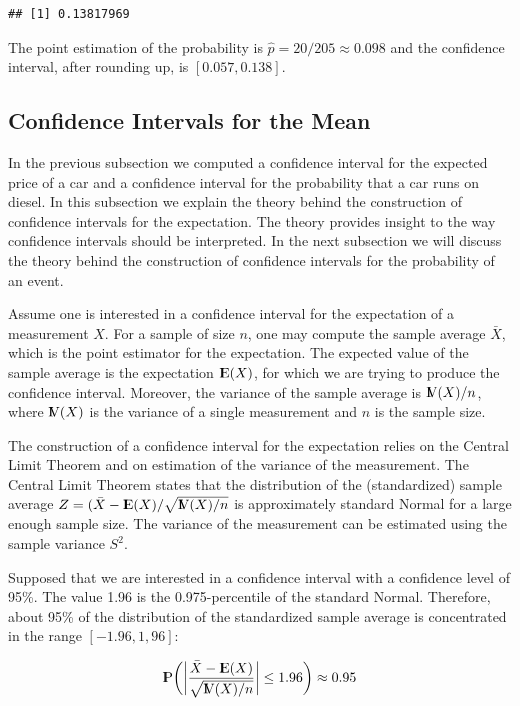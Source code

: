 \documentclass[]{krantz}
\newcommand{\Expec}{{\rm I\kern-.3em E}}
\newcommand{\Prob}{{\rm I\kern-.3em P}}
\newcommand{\Var}{{\rm I\kern-.3em V}}
\theoremstyle{definition}
\theoremstyle{definition}
\theoremstyle{definition}
\theoremstyle{remark}
\begin{document}
\begin{verbatim}
## [1] 0.13817969
\end{verbatim}

The point estimation of the probability is
\(\hat p = 20/205 \approx 0.098\) and the confidence interval, after
rounding up, is \([0.057, 0.138]\).

\subsection{Confidence Intervals for the Mean}\label{subsec:CImean}

In the previous subsection we computed a confidence interval for the
expected price of a car and a confidence interval for the probability
that a car runs on diesel. In this subsection we explain the theory
behind the construction of confidence intervals for the expectation. The
theory provides insight to the way confidence intervals should be
interpreted. In the next subsection we will discuss the theory behind
the construction of confidence intervals for the probability of an
event.

Assume one is interested in a confidence interval for the expectation of
a measurement \(X\). For a sample of size \(n\), one may compute the
sample average \(\bar X\), which is the point estimator for the
expectation. The expected value of the sample average is the expectation
\(\Expec(X)\), for which we are trying to produce the confidence
interval. Moreover, the variance of the sample average is \(\Var(X)/n\),
where \(\Var(X)\) is the variance of a single measurement and \(n\) is
the sample size.

The construction of a confidence interval for the expectation relies on
the Central Limit Theorem and on estimation of the variance of the
measurement. The Central Limit Theorem states that the distribution of
the (standardized) sample average
\(Z = (\bar X - \Expec(X)/\sqrt{\Var(X)/n}\) is approximately standard
Normal for a large enough sample size. The variance of the measurement
can be estimated using the sample variance \(S^2\).

Supposed that we are interested in a confidence interval with a
confidence level of 95\%. The value 1.96 is the 0.975-percentile of the
standard Normal. Therefore, about 95\% of the distribution of the
standardized sample average is concentrated in the range
\([-1.96,1,96]\):

\[\Prob \bigg(\bigg|\frac{\bar X - \Expec(X)}{\sqrt{\Var(X)/n}}\bigg| \leq 1.96 \bigg) \approx 0.95\]
\end{document}
